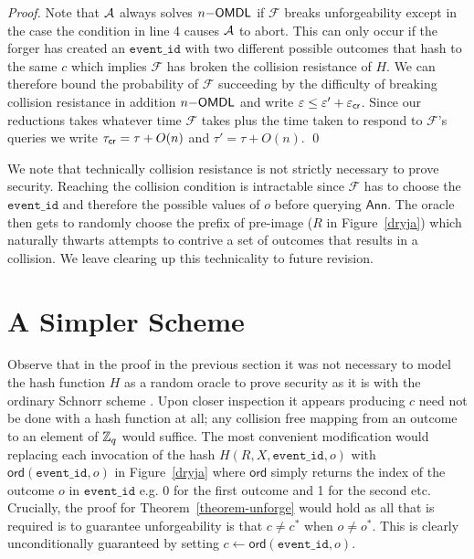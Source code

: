 \documentclass[runningheads]{llncs}
\newcommand{\eventid}{\mathtt{event\_id}}
\newcommand{\AnnO}{\mathsf{Ann}}
\newcommand{\F}{\mathcal{F}}
\begin{document}
\begin{proof}
    Note that $\mathcal{A}$ always solves $n\mathsf{-OMDL}$ if $\F$ breaks unforgeability except in the case the condition in line 4 causes $\mathcal{A}$ to abort.
    This can only occur if the forger has created an $\eventid$ with two different possible outcomes that hash to the same $c$ which implies $\F$ has broken the collision resistance of $H$.
    We can therefore bound the probability of $\F$ succeeding by the difficulty of breaking collision resistance in addition $n\mathsf{-OMDL}$ and write $\varepsilon \leq \varepsilon' + \varepsilon_{\mathsf{cr}}$.
    Since our reductions takes whatever time $\F$ takes plus the time taken to respond to $\F$'s queries we write $\tau_{\mathsf{cr}} = \tau + O(n)$ and $\tau' = \tau + O(n)$.
\qed
\end{proof}


We note that technically collision resistance is not strictly necessary to prove security.
Reaching the collision condition is intractable since $\F$ has to choose the $\eventid$ and therefore the possible values of $o$ before querying $\AnnO$.
The oracle then gets to randomly choose the prefix of pre-image ($R$ in Figure~\ref{dryja}) which naturally thwarts attempts to contrive a set of outcomes that results in a collision.
We leave clearing up this technicality to future revision.


\section{A Simpler Scheme}
\newcommand{\ord}{\mathsf{ord}}

Observe that in the proof in the previous section it was not necessary to model the hash function $H$ as a random oracle to prove security as it is with the ordinary Schnorr scheme \cite{pointcheval2000security}.
Upon closer inspection it appears producing $c$ need not be done with a hash function at all; any collision free mapping from an outcome to an element of $\mathbb{Z}_q$ would suffice.
The most convenient modification would replacing each invocation of the hash $H(R, X, \eventid, o)$  with $\ord(\eventid,o)$ in Figure~\ref{dryja} where $\ord$ simply returns the index of the outcome $o$ in $\eventid$ e.g. 0 for the first outcome and 1 for the second etc.
Crucially, the proof for Theorem~\ref{theorem-unforge} would hold as all that is required is to guarantee unforgeability is that $c \neq c^*$ when $o \neq o^{*}$.
This is clearly unconditionally guaranteed by setting $c \gets \ord(\eventid, o)$.
\end{document}
